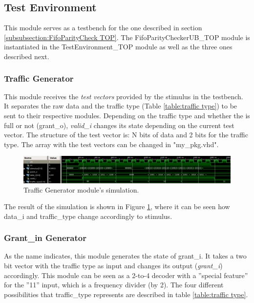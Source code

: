 \documentclass[12pt]{article}
\begin{document}
\subsection{Test Environment}
This module serves as a testbench for the one described in section \ref{subsubsection:FifoParityCheck TOP}.  The FifoParityCheckerUB\_TOP module is instantiated in the TestEnvironment\_TOP module as well as the three ones described next.

\subsubsection{Traffic Generator}
\label{subsubsection:Traffic Generator}
This module receives the \textit{test vectors} provided by the stimulus in the testbench. It separates the raw data and the traffic type (Table \ref{table:traffic type}) to be sent to their respective modules. Depending on the traffic type and whether the \fifo is full or not (grant\_o), \textit{valid\_i} changes its state depending on the current test vector.  The structure of the test vector is: N bits of data and 2 bits for the traffic type.  The array with the test vectors can be changed in "my\_pkg.vhd".

\begin{figure}[ht]
\centering
\includegraphics[width=15cm]{images/traffic-generator-simulation}
\caption{\label{fig:Traffic Generator Simulation}Traffic Generator module's simulation.}
\end{figure}

The result of the simulation is shown in Figure \ref{fig:Traffic Generator Simulation}, where it can be seen how data\_i and traffic\_type change accordingly to stimulus.

\subsubsection{Grant\_in Generator}
As the name indicates, this module generates the state of grant\_i. It takes a two bit vector with the traffic type as input and changes its output (\textit{grant\_i}) accordingly.  This module can be seen as a 2-to-4 decoder with a ''special feature'' for the ''11'' input, which is a frequency divider (by 2).  The four different possibilities that traffic\_type represents are described in table \ref{table:traffic type}.
\end{document}
